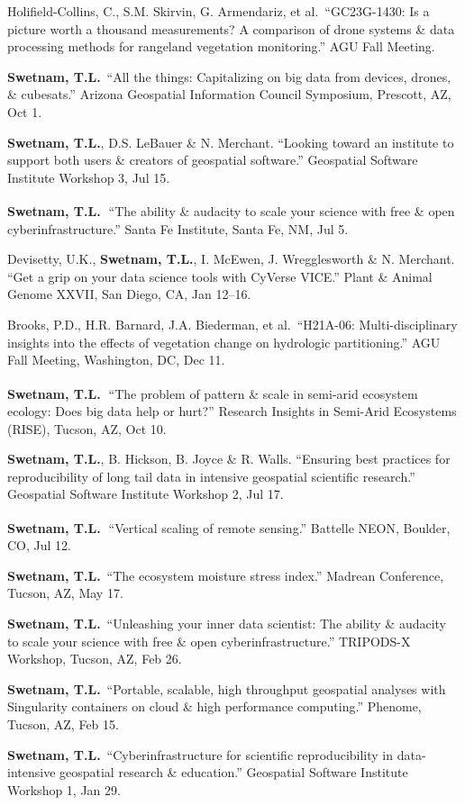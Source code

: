 \documentclass[11pt,letterpaper]{article}
\newcommand{\me}{\textbf{Swetnam, T.L.}}
\newcommand{\inv}{\textsuperscript{\color{cherry}\,\ding{72}}}
\newcommand{\yearhead}[1]{\par\vspace{5pt}{\small\bfseries\color{cherry}#1}\par\vspace{2pt}}
\newenvironment{hanglist}
  {\begin{list}{}{\setlength{\leftmargin}{1.4em}\setlength{\itemindent}{-1.4em}%
     \setlength{\itemsep}{3pt}\setlength{\parsep}{0pt}\setlength{\topsep}{1pt}}}
  {\end{list}}
\begin{document}
\yearhead{2019}
\begin{hanglist}
\item Holifield-Collins, C., S.M. Skirvin, G. Armendariz, et al.\ ``GC23G-1430: Is a picture worth a thousand measurements? A comparison of drone systems \& data processing methods for rangeland vegetation monitoring.'' AGU Fall Meeting.
\item \me\ ``All the things: Capitalizing on big data from devices, drones, \& cubesats.'' Arizona Geospatial Information Council Symposium, Prescott, AZ, Oct 1.
\item \me, D.S. LeBauer \& N. Merchant. ``Looking toward an institute to support both users \& creators of geospatial software.'' Geospatial Software Institute Workshop 3, Jul 15.
\item \me\inv\ ``The ability \& audacity to scale your science with free \& open cyberinfrastructure.'' Santa Fe Institute, Santa Fe, NM, Jul 5.
\item Devisetty, U.K., \me, I. McEwen, J. Wregglesworth \& N. Merchant. ``Get a grip on your data science tools with CyVerse VICE.'' Plant \& Animal Genome XXVII, San Diego, CA, Jan 12--16.
\end{hanglist}

\yearhead{2018}
\begin{hanglist}
\item Brooks, P.D., H.R. Barnard, J.A. Biederman, et al.\ ``H21A-06: Multi-disciplinary insights into the effects of vegetation change on hydrologic partitioning.'' AGU Fall Meeting, Washington, DC, Dec 11.
\item \me\inv\ ``The problem of pattern \& scale in semi-arid ecosystem ecology: Does big data help or hurt?'' Research Insights in Semi-Arid Ecosystems (RISE), Tucson, AZ, Oct 10.
\item \me, B. Hickson, B. Joyce \& R. Walls. ``Ensuring best practices for reproducibility of long tail data in intensive geospatial scientific research.'' Geospatial Software Institute Workshop 2, Jul 17.
\item \me\inv\ ``Vertical scaling of remote sensing.'' Battelle NEON, Boulder, CO, Jul 12.
\item \me\ ``The ecosystem moisture stress index.'' Madrean Conference, Tucson, AZ, May 17.
\item \me\ ``Unleashing your inner data scientist: The ability \& audacity to scale your science with free \& open cyberinfrastructure.'' TRIPODS-X Workshop, Tucson, AZ, Feb 26.
\item \me\ ``Portable, scalable, high throughput geospatial analyses with Singularity containers on cloud \& high performance computing.'' Phenome, Tucson, AZ, Feb 15.
\item \me\ ``Cyberinfrastructure for scientific reproducibility in data-intensive geospatial research \& education.'' Geospatial Software Institute Workshop 1, Jan 29.
\end{hanglist}
\end{document}
